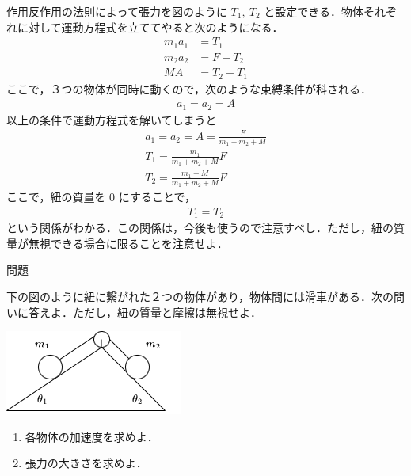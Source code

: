\documentclass[
  b4paperpaper,
  xelatex,ja=standard]{bxjsbook}
\providecommand{\tightlist}{%
  \setlength{\itemsep}{0pt}\setlength{\parskip}{0pt}}\usepackage{longtable,booktabs,array}
\begin{document}
作用反作用の法則によって張力を図のように \(T_1,\:T_2\)
と設定できる．物体それぞれに対して運動方程式を立ててやると次のようになる．
\begin{align*}
m_1a_1 &= T_1 \\
m_2a_2 &= F-T_2 \\
MA &= T_2-T_1
\end{align*}
ここで，３つの物体が同時に動くので，次のような束縛条件が科される．
\begin{align*}
a_1=a_2=A
\end{align*} 以上の条件で運動方程式を解いてしまうと \begin{align*}
a_1=a_2=A=\frac{F}{m_1+m_2+M}\\
T_1=\frac{m_1}{m_1+m_2+M}F\\
T_2=\frac{m_1+M}{m_1+m_2+M}F
\end{align*} ここで，紐の質量を \(0\) にすることで， \begin{align*}
T_1=T_2
\end{align*}
という関係がわかる．この関係は，今後も使うので注意すべし．ただし，紐の質量が無視できる場合に限ることを注意せよ．

\begin{Qbox}{問題}

下の図のように紐に繋がれた２つの物体があり，物体間には滑車がある．次の問いに答えよ．ただし，紐の質量と摩擦は無視せよ．

\includegraphics{source/images/newton/newton7.png}

\begin{enumerate}
\def\labelenumi{\arabic{enumi}.}
\tightlist
\item
  各物体の加速度を求めよ．
\item
  張力の大きさを求めよ．
\end{enumerate}

\end{Qbox}

\end{document}
